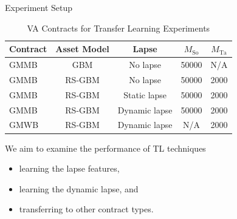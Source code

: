 \documentclass[9pt,handout]{beamer}
\begin{document}
\begin{frame}{Experiment Setup}

    \begin{table}[ht!] 
        \centering
        \begin{tabular}{lcccc} 
        \toprule
        \textbf{Contract} & \textbf{Asset Model} & \textbf{Lapse} & \textbf{$M_{\text{So}}$}  & \textbf{$M_{\text{Ta}}$}\\
        \midrule
        GMMB & GBM & No lapse & 50000 & N/A \\
        GMMB & RS-GBM & No lapse & 50000 & 2000 \\
        GMMB & RS-GBM & Static lapse & 50000 & 2000 \\
        GMMB & RS-GBM & Dynamic lapse & 50000 & 2000 \\
        GMWB & RS-GBM & Dynamic lapse & N/A & 2000 \\
        \bottomrule
        \end{tabular}
        \caption{VA Contracts for Transfer Learning Experiments}
    \end{table}

    We aim to examine the performance of TL techniques
    \begin{itemize}
        \item   learning the lapse features,
        \item   learning the dynamic lapse, and 
        \item   transferring to other contract types.
    \end{itemize}

\end{frame}
\end{document}
